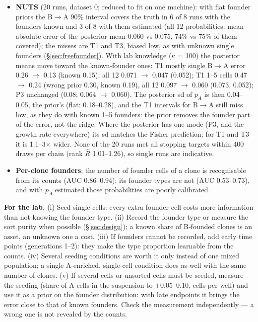 \documentclass[10pt,a4paper]{article}
\newcommand{\BA}{B$\to$A}
\begin{document}
\begin{itemize}
\item \textbf{NUTS} (20 runs, dataset 0; reduced to fit on one machine): with flat founder priors the \BA{} 90\% interval covers the truth in 6 of 8 runs with the founders known and 3 of 8 with them estimated (all 12 probabilities: mean absolute error of the posterior mean 0.060 vs 0.075, 74\% vs 75\% of them covered); the misses are T1 and T3, biased low, as with unknown single founders (\S\ref{sec:freefounder}). With lab knowledge ($\kappa$ = 100) the posterior means move toward the known-founder ones: T1 mostly single \BA{} error 0.26 $\to$ 0.13 (known 0.15), all 12 0.071 $\to$ 0.047 (0.052); T1 1--5 cells 0.47 $\to$ 0.24 (wrong prior 0.30, known 0.19), all 12 0.097 $\to$ 0.060 (0.073, 0.052); P3 unchanged (0.08; 0.064 $\to$ 0.060). The posterior sd of $p_A$ is then 0.04--0.05, the prior's (flat: 0.18--0.28), and the T1 intervals for \BA{} still miss low, as they do with known 1--5 founders: the prior removes the founder part of the error, not the ridge. Where the posterior has one mode (P3, and the growth rate everywhere) its sd matches the Fisher prediction; for T1 and T3 it is 1.1--3$\times$ wider. None of the 20 runs met all stopping targets within 400 draws per chain (rank $\hat R$ 1.01--1.26), so single runs are indicative.
\item \textbf{Per-clone founders}: the number of founder cells of a clone is recognisable from its counts (AUC 0.86--0.94); its founder types are not (AUC 0.53--0.73), and with $p_A$ estimated those probabilities are poorly calibrated.
\end{itemize}

\textbf{For the lab.} (i) Seed single cells: every extra founder cell costs more information than not knowing the founder type. (ii) Record the founder type or measure the sort purity when possible (\S\ref{sec:design}); a known share of B-founded clones is an asset, an unknown one a cost. (iii) If founders cannot be recorded, add early time points (generations 1--2): they make the type proportion learnable from the counts. (iv) Several seeding conditions are worth it only instead of one mixed population; a single A-enriched, single-cell condition does as well with the same number of clones. (v) If several cells or unsorted cells must be seeded, measure the seeding (share of A cells in the suspension to $\pm$0.05--0.10, cells per well) and use it as a prior on the founder distribution: with late endpoints it brings the error close to that of known founders. Check the measurement independently --- a wrong one is not revealed by the counts.
\end{document}
